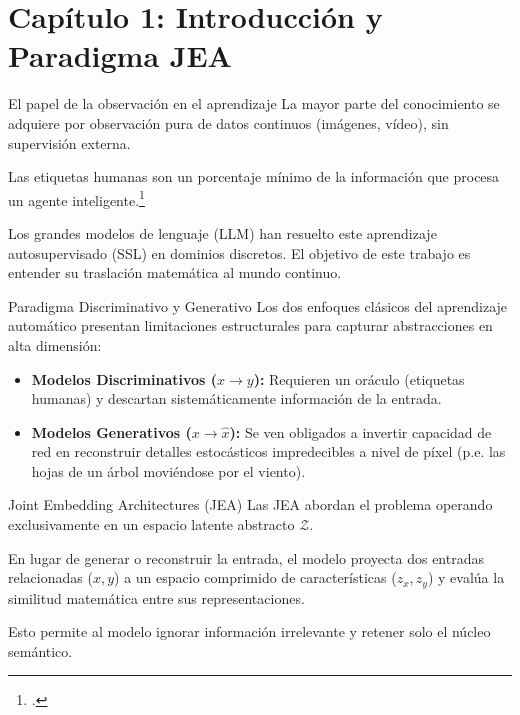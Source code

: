 \documentclass[aspectratio=169, 12pt]{beamer}
\begin{document}
\section{Capítulo 1: Introducción y Paradigma JEA}

\begin{frame}{El papel de la observación en el aprendizaje}
La mayor parte del conocimiento se adquiere por observación pura de datos continuos (imágenes, vídeo), sin supervisión externa. 

Las etiquetas humanas son un porcentaje mínimo de la información que procesa un agente inteligente.\footcite{lecun2022path}

Los grandes modelos de lenguaje (LLM) han resuelto este aprendizaje autosupervisado (SSL) en dominios discretos. El objetivo de este trabajo es entender su traslación matemática al mundo continuo.
\end{frame}

\begin{frame}{Paradigma Discriminativo y Generativo}
Los dos enfoques clásicos del aprendizaje automático presentan limitaciones estructurales para capturar abstracciones en alta dimensión:
\vspace{0.5cm}
\begin{itemize}
    \item \textbf{Modelos Discriminativos ($x \to y$):} Requieren un oráculo (etiquetas humanas) y descartan sistemáticamente información de la entrada.
    \item \textbf{Modelos Generativos ($x \to \hat{x}$):} Se ven obligados a invertir capacidad de red en reconstruir detalles estocásticos impredecibles a nivel de píxel (p.e. las hojas de un árbol moviéndose por el viento).
\end{itemize}
\end{frame}

\begin{frame}{Joint Embedding Architectures (JEA)}
Las JEA abordan el problema operando exclusivamente en un espacio latente abstracto $\mathcal{Z}$. 

\vspace{0.5cm}
En lugar de generar o reconstruir la entrada, el modelo proyecta dos entradas relacionadas ($x, y$) a un espacio comprimido de características ($z_x, z_y$) y evalúa la similitud matemática entre sus representaciones.

Esto permite al modelo ignorar información irrelevante y retener solo el núcleo semántico.
\end{frame}
\end{document}
